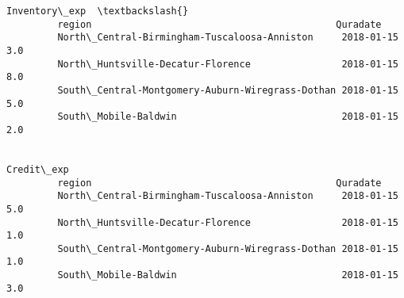 \documentclass[11pt]{article}
\begin{document}
\begin{Verbatim}[commandchars=\\\{\}]
                                                                      Inventory\_exp  \textbackslash{}
         region                                           Quradate                    
         North\_Central-Birmingham-Tuscaloosa-Anniston     2018-01-15            3.0   
         North\_Huntsville-Decatur-Florence                2018-01-15            8.0   
         South\_Central-Montgomery-Auburn-Wiregrass-Dothan 2018-01-15            5.0   
         South\_Mobile-Baldwin                             2018-01-15            2.0   
         
                                                                      Credit\_exp  
         region                                           Quradate                
         North\_Central-Birmingham-Tuscaloosa-Anniston     2018-01-15         5.0  
         North\_Huntsville-Decatur-Florence                2018-01-15         1.0  
         South\_Central-Montgomery-Auburn-Wiregrass-Dothan 2018-01-15         1.0  
         South\_Mobile-Baldwin                             2018-01-15         3.0  
\end{Verbatim}
            
\end{document}
